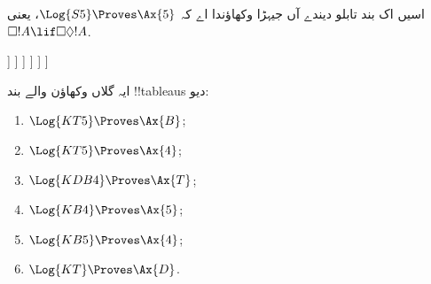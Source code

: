 \documentclass[../../../include/open-logic-section]{subfiles}
\begin{document}
\begin{ex}
  اسیں اک بند تابلو دیندے آں جیہڑا وکھاؤندا اے کہ $\Log{S5} \Proves \Ax{5}$، یعنی
  $\Box!A \lif \Box\Diamond!A$.
  \begin{oltableau}
    [\pFmla{\False}{\Box\formula{A} \lif \Box\Diamond \formula{A}}{1},
      just = \TAss
      [\pFmla{\True}{\Box \formula{A}}{1}, just = {\TRule{\False}{\lif}[1]}
        [\pFmla{\False}{\Box\Diamond \formula{A}}{1},
          just = {\TRule{\False}{\lif}[1]}
          [\pFmla{\False}{\Diamond \formula{A}}{1.1},
            just = {\TRule{\False}{\Box}[3]}
            [\pFmla{\False}{\Diamond \formula{A}}{1},
              just = {4r$\Diamond$ 4}
              [\pFmla{\False}{\formula{A}}{1.1},
                just = {\TRule{\False}{\Diamond}[5]}
                [\pFmla{\True}{\formula{A}}{1.1},
                  just = {\TRule{\True}{\Box}[2]}, close]
              ]
            ]
          ]
        ]
      ]
    ]
  \end{oltableau}
\end{ex}

\begin{prob}
ایہ گلاں وکھاؤن والے بند !!{tableau}s دیو:
  \begin{enumerate}
  \item $\Log{KT5} \Proves \Ax{B}$;
  \item $\Log{KT5} \Proves \Ax{4}$;
  \item $\Log{KDB4} \Proves \Ax{T}$;
  \item $\Log{KB4} \Proves \Ax{5}$;
  \item $\Log{KB5} \Proves \Ax{4}$;
  \item $\Log{KT} \Proves \Ax{D}$.
  \end{enumerate}
\end{prob}
\end{document}
